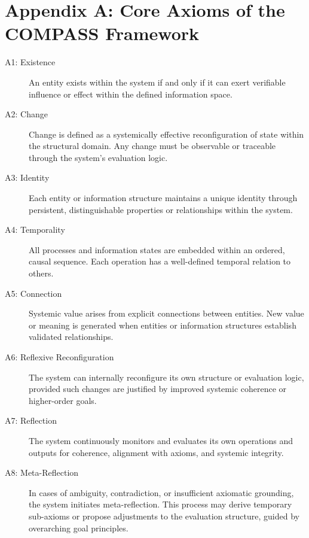 \section*{Appendix A: Core Axioms of the COMPASS Framework}

\begin{description}

\item[A1: Existence]  
An entity exists within the system if and only if it can exert verifiable influence or effect within the defined information space.

\item[A2: Change]  
Change is defined as a systemically effective reconfiguration of state within the structural domain. Any change must be observable or traceable through the system's evaluation logic.

\item[A3: Identity]  
Each entity or information structure maintains a unique identity through persistent, distinguishable properties or relationships within the system.

\item[A4: Temporality]  
All processes and information states are embedded within an ordered, causal sequence. Each operation has a well-defined temporal relation to others.

\item[A5: Connection]  
Systemic value arises from explicit connections between entities. New value or meaning is generated when entities or information structures establish validated relationships.

\item[A6: Reflexive Reconfiguration]  
The system can internally reconfigure its own structure or evaluation logic, provided such changes are justified by improved systemic coherence or higher-order goals.

\item[A7: Reflection]  
The system continuously monitors and evaluates its own operations and outputs for coherence, alignment with axioms, and systemic integrity.

\item[A8: Meta-Reflection]  
In cases of ambiguity, contradiction, or insufficient axiomatic grounding, the system initiates meta-reflection. This process may derive temporary sub-axioms or propose adjustments to the evaluation structure, guided by overarching goal principles.


\end{description}
